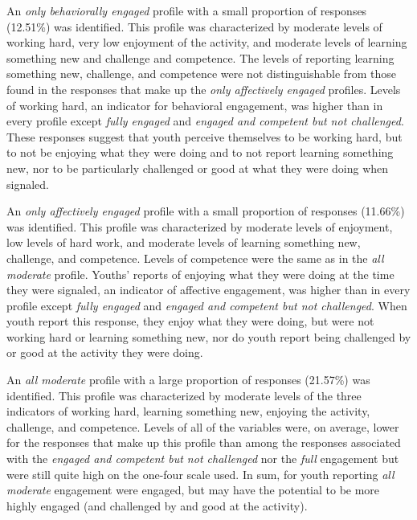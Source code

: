 \documentclass[]{msu-thesis}
\theoremstyle{definition}
\theoremstyle{definition}
\theoremstyle{definition}
\theoremstyle{remark}
\begin{document}
An \emph{only behaviorally engaged} profile with a small proportion of
responses (12.51\%) was identified. This profile was characterized by
moderate levels of working hard, very low enjoyment of the activity, and
moderate levels of learning something new and challenge and competence.
The levels of reporting learning something new, challenge, and
competence were not distinguishable from those found in the responses
that make up the \emph{only affectively engaged} profiles. Levels of
working hard, an indicator for behavioral engagement, was higher than in
every profile except \emph{fully engaged} and \emph{engaged and
competent but not challenged}. These responses suggest that youth
perceive themselves to be working hard, but to not be enjoying what they
were doing and to not report learning something new, nor to be
particularly challenged or good at what they were doing when signaled.

An \emph{only affectively engaged} profile with a small proportion of
responses (11.66\%) was identified. This profile was characterized by
moderate levels of enjoyment, low levels of hard work, and moderate
levels of learning something new, challenge, and competence. Levels of
competence were the same as in the \emph{all moderate} profile. Youths'
reports of enjoying what they were doing at the time they were signaled,
an indicator of affective engagement, was higher than in every profile
except \emph{fully engaged} and \emph{engaged and competent but not
challenged}. When youth report this response, they enjoy what they were
doing, but were not working hard or learning something new, nor do youth
report being challenged by or good at the activity they were doing.

An \emph{all moderate} profile with a large proportion of responses
(21.57\%) was identified. This profile was characterized by moderate
levels of the three indicators of working hard, learning something new,
enjoying the activity, challenge, and competence. Levels of all of the
variables were, on average, lower for the responses that make up this
profile than among the responses associated with the \emph{engaged and
competent but not challenged} nor the \emph{full} engagement but were
still quite high on the one-four scale used. In sum, for youth reporting
\emph{all moderate} engagement were engaged, but may have the potential
to be more highly engaged (and challenged by and good at the activity).
\end{document}
